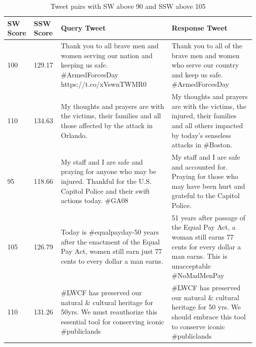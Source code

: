 \documentclass[11pt]{article}
\begin{document}
\begin{flushleft}
\begin{table}[]
\tiny
\centering
\caption{Tweet pairs with SW above 90 and SSW above 105}
\label{tbl:diff}
\begin{tabular}{|p{}|p{}|p{}|p{}|}
\hline
SW Score & SSW Score & Query Tweet                                                                                                                                              & Response Tweet                                                                                                                                            \\ \hline
100      & 129.17    & Thank you to all brave men and women serving our nation and keeping us safe. \#ArmedForcesDay https://t.co/xVswnTWMR0                                    & Thank you to all of the brave men and women who serve our country and keep us safe. \#ArmedForcesDay                                                      \\ \hline
110      & 134.63    & My thoughts and prayers are with the victims, their families and all those affected by the attack in Orlando.                                            & My thoughts and prayers are with the victims, the injured, their families and all others impacted by today's senseless attacks in \#Boston.               \\ \hline
95       & 118.66    & My staff and I are safe and praying for anyone who may be injured. Thankful for the U.S. Capitol Police and their swift actions today. \#GA08            & My staff and I are safe and accounted for. Praying for those who may have been hurt and grateful to the Capitol Police.                                   \\ \hline
105      & 126.79    & Today is \#equalpayday-50 years after the enactment of the Equal Pay Act, women still earn just 77 cents to every dollar a man earns.                    & 51 years after passage of the Equal Pay Act, a woman still earns 77 cents for every dollar a man earns. This is unacceptable \#NoMadMenPay                \\ \hline
110      & 131.26    & \#LWCF has preserved our natural \& cultural heritage for 50yrs. We must reauthorize this essential tool for conserving iconic \#publiclands         & \#LWCF has preserved our natural \& cultural heritage for 50 yrs. We should embrace this tool to conserve iconic \#publiclands                        \\ \hline

\end{tabular}
\end{table}
\end{flushleft}
\end{document}
